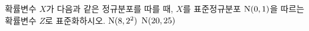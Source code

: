 확률변수 $X$가 다음과 같은 정규분포를 따를 때, $X$를 표준정규분포 $\mathrm{N}(0{,}\mkern3mu\mathopen{}1)$을 따르는 확률변수 $Z$로 표준화하시오.
 $\mathrm{N}(8{,}\mkern3mu\mathopen{}2^2)$
 $\mathrm{N}(20{,}\mkern3mu\mathopen{}25)$
